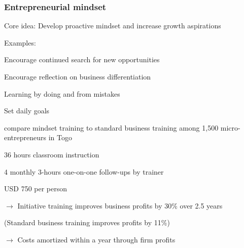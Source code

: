 \documentclass[hideothersubsections, usenames,dvipsnames,11pt]{beamer}
\newenvironment{itemize_2pt}{\itemize\addtolength{\itemsep}{2pt}}{\enditemize}
\begin{document}
\begin{frame}
\frametitle{Entrepreneurial mindset}

Core idea: \textcolor{bdf}{Develop proactive mindset and increase growth aspirations}
\begin{itemize_2pt}
	\item Examples: 
	\begin{itemize_2pt}
		\item Encourage continued search for new opportunities
		\item Encourage reflection on business differentiation
		\item Learning by doing and from mistakes
		\item Set daily goals
	\end{itemize_2pt}
	
	\vspace{1.0em}
	
	\item \citet{Campos2017} compare mindset training to standard business training among 1,500 micro-entrepreneurs in Togo
	\begin{itemize_2pt}
		\item 36 hours classroom instruction
		\item 4 monthly 3-hours one-on-one follow-ups by trainer
		\item USD 750 per person
		\item[] $\rightarrow$ \textcolor{bdf}{Initiative training improves business profits by 30\% over 2.5 years}
		\item[] \quad (Standard business training improves profits by 11\%)
		\item[] $\rightarrow$ \textcolor{bdf}{Costs amortized within a year through firm profits}
	\end{itemize_2pt}

	\end{itemize_2pt}
\end{frame}
\end{document}
